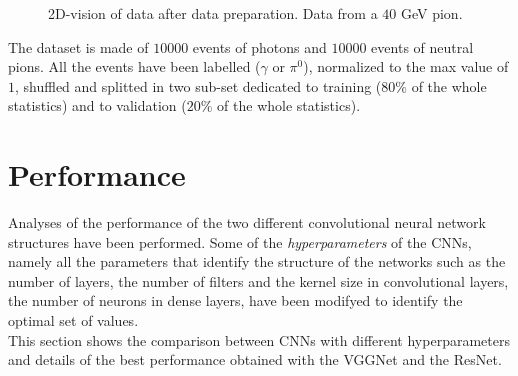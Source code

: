 \begin{figure}
	\centering
	 \quad
	\caption{2D-vision of data after data preparation. Data from a $40$ GeV pion.}
	\label{fig:2Dvision4}
\end{figure}

The dataset is made of $10000$ events of photons and $10000$ events of neutral pions. All the events have been labelled ($\gamma$ or $\pi^0$), normalized to the max value of $1$, shuffled and splitted in two sub-set dedicated to training ($80\%$ of the whole statistics) and to validation ($20\%$ of the whole statistics).\\

\section{Performance}\label{sec:NN_perf}
Analyses of the performance of the two different convolutional neural network structures have been performed. Some of the \textit{hyperparameters} of the CNNs, namely all the parameters that identify the structure of the networks such as the number of layers, the number of filters and the kernel size in convolutional layers, the number of neurons in dense layers, have been modifyed to identify the optimal set of values.\\
This section shows the comparison between CNNs with different hyperparameters and details of the best performance obtained with the VGGNet and the ResNet.

